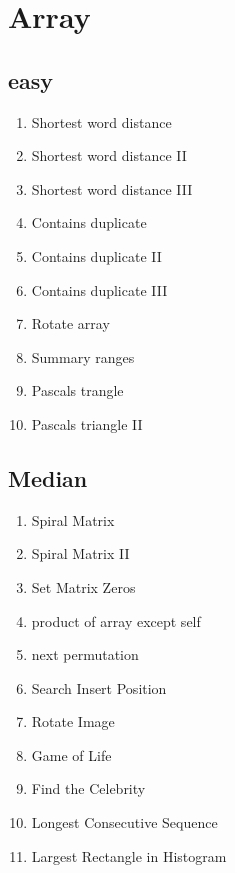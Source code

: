 \documentclass[DIV=calc, paper=a4, fontsize=11pt, twocolumn]{scrartcl}	 %
\begin{document}

\section*{Array}

\subsection*{easy}
\begin{enumerate}
\item Shortest word distance \cite{243}
\item Shortest word distance II \cite{244}
\item Shortest word distance III \cite{245}
\item Contains duplicate \cite{217}
\item Contains duplicate II \cite{219}
\item Contains duplicate III \cite{220}
\item Rotate array \cite{189}
\item Summary ranges \cite{228}
\item Pascals trangle \cite{118}
\item Pascals triangle II \cite{119}
\end{enumerate}

\subsection*{Median}
\begin{enumerate}
\item Spiral Matrix \cite{054}
\item Spiral Matrix II \cite{059}
\item Set Matrix Zeros \cite{073}
\item product of array except self \cite{238}
\item next permutation \cite{031}
\item Search Insert Position \cite{035}
\item Rotate Image \cite{048}
\item Game of Life \cite{289}
\item Find the Celebrity \cite{277}
\item Longest Consecutive Sequence \cite{128}
\item {\color{red} Largest Rectangle in Histogram} \cite{084}

\end{enumerate}
\end{document}
